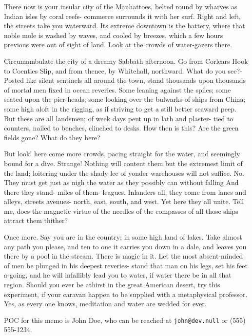 \documentclass{armymemo}
\begin{document}
\Nii There now is your insular city of the Manhattoes, belted round by wharves as
Indian isles by coral reefs- commerce surrounds it with her surf. Right and
left, the streets take you waterward. Its extreme downtown is the battery, where
that noble mole is washed by waves, and cooled by breezes, which a few hours
previous were out of sight of land. Look at the crowds of water-gazers there.

\Nii Circumambulate the city of a dreamy Sabbath afternoon. Go from Corlears Hook to
Coenties Slip, and from thence, by Whitehall, northward. What do you see?-
Posted like silent sentinels all around the town, stand thousands upon thousands
of mortal men fixed in ocean reveries. Some leaning against the spiles; some
seated upon the pier-heads; some looking over the bulwarks of ships from China;
some high aloft in the rigging, as if striving to get a still better seaward
peep. But these are all landsmen; of week days pent up in lath and plaster- tied
to counters, nailed to benches, clinched to desks. How then is this? Are the
green fields gone? What do they here?

\Nii But look! here come more crowds, pacing straight for the water, and seemingly
bound for a dive. Strange! Nothing will content them but the extremest limit of
the land; loitering under the shady lee of yonder warehouses will not suffice.
No. They must get just as nigh the water as they possibly can without falling
And there they stand- miles of them- leagues. Inlanders all, they come from
lanes and alleys, streets avenues- north, east, south, and west. Yet here they
all unite. Tell me, does the magnetic virtue of the needles of the compasses of
all those ships attract them thither?

\Nii Once more. Say you are in the country; in some high land of lakes. Take almost
any path you please, and ten to one it carries you down in a dale, and leaves
you there by a pool in the stream. There is magic in it. Let the most
absent-minded of men be plunged in his deepest reveries- stand that man on his
legs, set his feet a-going, and he will infallibly lead you to water, if water
there be in all that region. Should you ever be athirst in the great American
desert, try this experiment, if your caravan happen to be supplied with a
metaphysical professor. Yes, as every one knows, meditation and water are wedded
for ever.

\Ni POC for this memo is John Doe, who can be reached at \texttt{john@dev.null}
or (555) 555-1234.

\end{document}
